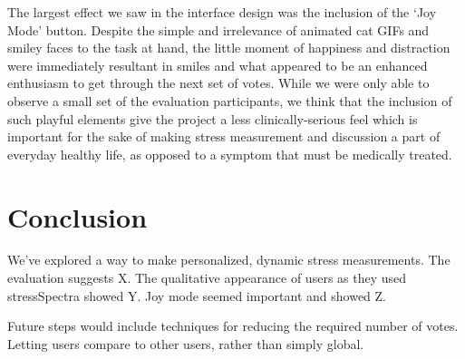 \documentclass{sigchi}
\begin{document}
The largest effect we saw in the interface design was the inclusion of the ‘Joy Mode’ button. Despite the simple and irrelevance of animated cat GIFs and smiley faces to the task at hand, the little moment of happiness and distraction were immediately resultant in smiles and what appeared to be an enhanced enthusiasm to get through the next set of votes. While we were only able to observe a small set of the evaluation participants, we think that the inclusion of such playful elements give the project a less clinically-serious feel which is important for the sake of making stress measurement and discussion a part of everyday healthy life, as opposed to a symptom that must be medically treated. 

\section{Conclusion}
We’ve explored a way to make personalized, dynamic stress measurements. The evaluation suggests X. The qualitative appearance of users as they used stressSpectra showed Y. Joy mode seemed important and showed Z.


Future steps would include techniques for reducing the required number of votes. Letting users compare to other users, rather than simply global. 



\balance




\end{document}
